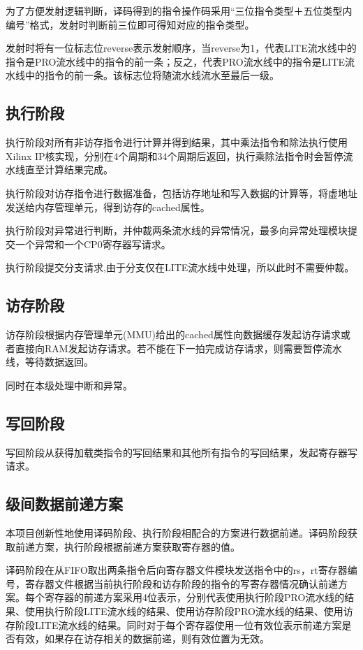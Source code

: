 为了方便发射逻辑判断，译码得到的指令操作码采用“三位指令类型＋五位类型内编号”格式，发射时判断前三位即可得知对应的指令类型。

发射时将有一位标志位reverse表示发射顺序，当reverse为1，代表LITE流水线中的指令是PRO流水线中的指令的前一条；反之，代表PRO流水线中的指令是LITE流水线中的指令的前一条。该标志位将随流水线流水至最后一级。

\subsection{执行阶段}
执行阶段对所有非访存指令进行计算并得到结果，其中乘法指令和除法执行使用Xilinx IP核实现，分别在4个周期和34个周期后返回，执行乘除法指令时会暂停流水线直至计算结果完成。

执行阶段对访存指令进行数据准备，包括访存地址和写入数据的计算等，将虚地址发送给内存管理单元，得到访存的cached属性。

执行阶段对异常进行判断，并仲裁两条流水线的异常情况，最多向异常处理模块提交一个异常和一个CP0寄存器写请求。

执行阶段提交分支请求,由于分支仅在LITE流水线中处理，所以此时不需要仲裁。

\subsection{访存阶段}
访存阶段根据内存管理单元(MMU)给出的cached属性向数据缓存发起访存请求或者直接向RAM发起访存请求。若不能在下一拍完成访存请求，则需要暂停流水线，等待数据返回。

同时在本级处理中断和异常。

\subsection{写回阶段}
写回阶段从获得加载类指令的写回结果和其他所有指令的写回结果，发起寄存器写请求。

\subsection{级间数据前递方案}
本项目创新性地使用译码阶段、执行阶段相配合的方案进行数据前递。译码阶段获取前递方案，执行阶段根据前递方案获取寄存器的值。

译码阶段在从FIFO取出两条指令后向寄存器文件模块发送指令中的rs，rt寄存器编号，寄存器文件根据当前执行阶段和访存阶段的指令的写寄存器情况确认前递方案。每个寄存器的前递方案采用4位表示，分别代表使用执行阶段PRO流水线的结果、使用执行阶段LITE流水线的结果、使用访存阶段PRO流水线的结果、使用访存阶段LITE流水线的结果。同时对于每个寄存器使用一位有效位表示前递方案是否有效，如果存在访存相关的数据前递，则有效位置为无效。

